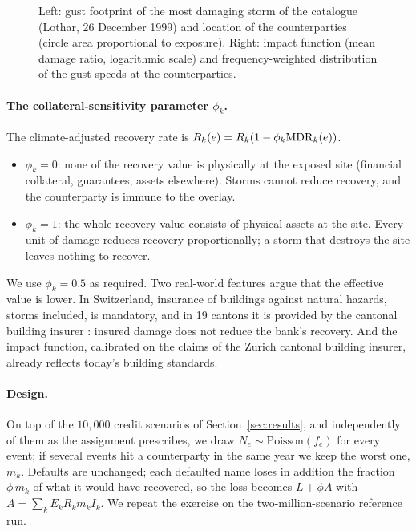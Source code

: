 \begin{figure}[tb]
\centering
{}
\caption{Left: gust footprint of the most damaging storm of the catalogue (Lothar, 26 December 1999) and location of the counterparties (circle area proportional to exposure). Right: impact function (mean damage ratio, logarithmic scale) and frequency-weighted distribution of the gust speeds at the counterparties.}
\label{fig:climhaz}
\end{figure}

\paragraph{The collateral-sensitivity parameter $\phi_k$.}
The climate-adjusted recovery rate is $R_k(e)=R_k(1-\phi_k\mathrm{MDR}_k(e))$.
\begin{itemize}
\item $\phi_k=0$: none of the recovery value is physically at the exposed site (financial collateral, guarantees, assets elsewhere). Storms cannot reduce recovery, and the counterparty is immune to the overlay.
\item $\phi_k=1$: the whole recovery value consists of physical assets at the site. Every unit of damage reduces recovery proportionally; a storm that destroys the site leaves nothing to recover.
\end{itemize}
We use $\phi_k=0.5$ as required. Two real-world features argue that the effective value is lower. In Switzerland, insurance of buildings against natural hazards, storms included, is mandatory, and in 19 cantons it is provided by the cantonal building insurer \citep{BAFU20}: insured damage does not reduce the bank's recovery. And the impact function, calibrated on the claims of the Zurich cantonal building insurer, already reflects today's building standards.

\paragraph{Design.}
On top of the $10{,}000$ credit scenarios of Section~\ref{sec:results}, and independently of them as the assignment prescribes, we draw $N_e\sim\mathrm{Poisson}(f_e)$ for every event; if several events hit a counterparty in the same year we keep the worst one, $m_k$. Defaults are unchanged; each defaulted name loses in addition the fraction $\phi\,m_k$ of what it would have recovered, so the loss becomes $L+\phi A$ with $A=\sum_kE_kR_km_kI_k$. We repeat the exercise on the two-million-scenario reference run.

